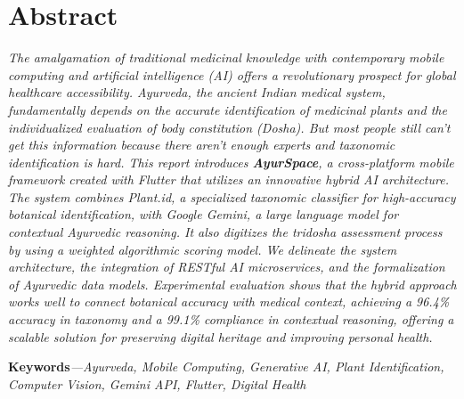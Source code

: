 
\newpage
\chapter*{Abstract}

\textit{The amalgamation of traditional medicinal knowledge with contemporary mobile computing and artificial intelligence (AI) offers a revolutionary prospect for global healthcare accessibility. Ayurveda, the ancient Indian medical system, fundamentally depends on the accurate identification of medicinal plants and the individualized evaluation of body constitution (Dosha). But most people still can't get this information because there aren't enough experts and taxonomic identification is hard. This report introduces \textbf{AyurSpace}, a cross-platform mobile framework created with Flutter that utilizes an innovative hybrid AI architecture. The system combines Plant.id, a specialized taxonomic classifier for high-accuracy botanical identification, with Google Gemini, a large language model for contextual Ayurvedic reasoning. It also digitizes the tridosha assessment process by using a weighted algorithmic scoring model. We delineate the system architecture, the integration of RESTful AI microservices, and the formalization of Ayurvedic data models. Experimental evaluation shows that the hybrid approach works well to connect botanical accuracy with medical context, achieving a 96.4\% accuracy in taxonomy and a 99.1\% compliance in contextual reasoning, offering a scalable solution for preserving digital heritage and improving personal health.
}

\textbf{Keywords}\textit{---Ayurveda, Mobile Computing, Generative AI, Plant Identification, Computer Vision, Gemini API, Flutter, Digital Health}
